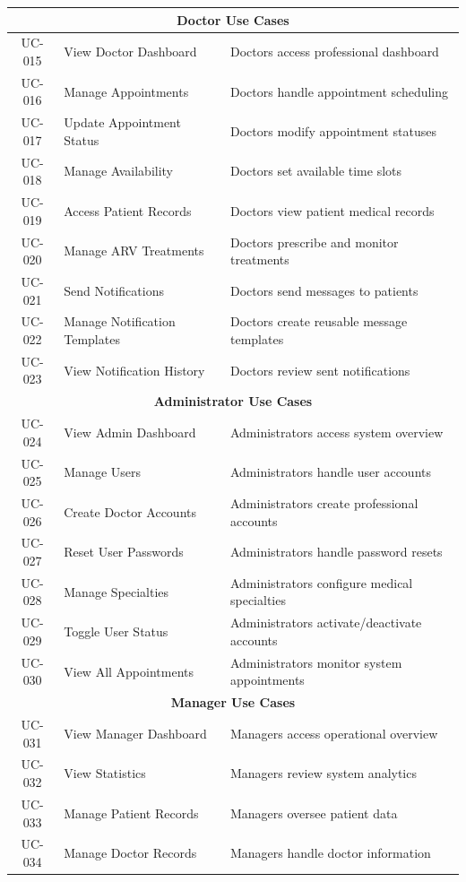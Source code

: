 \documentclass[12pt,a4paper]{article}
\begin{document}
\begin{longtable}{|c|p{4cm}|p{9cm}|}
\hline
\multicolumn{3}{|c|}{\textbf{Doctor Use Cases}} \\
\hline
UC-015 & View Doctor Dashboard & Doctors access professional dashboard \\
\hline
UC-016 & Manage Appointments & Doctors handle appointment scheduling \\
\hline
UC-017 & Update Appointment Status & Doctors modify appointment statuses \\
\hline
UC-018 & Manage Availability & Doctors set available time slots \\
\hline
UC-019 & Access Patient Records & Doctors view patient medical records \\
\hline
UC-020 & Manage ARV Treatments & Doctors prescribe and monitor treatments \\
\hline
UC-021 & Send Notifications & Doctors send messages to patients \\
\hline
UC-022 & Manage Notification Templates & Doctors create reusable message templates \\
\hline
UC-023 & View Notification History & Doctors review sent notifications \\
\hline
\multicolumn{3}{|c|}{\textbf{Administrator Use Cases}} \\
\hline
UC-024 & View Admin Dashboard & Administrators access system overview \\
\hline
UC-025 & Manage Users & Administrators handle user accounts \\
\hline
UC-026 & Create Doctor Accounts & Administrators create professional accounts \\
\hline
UC-027 & Reset User Passwords & Administrators handle password resets \\
\hline
UC-028 & Manage Specialties & Administrators configure medical specialties \\
\hline
UC-029 & Toggle User Status & Administrators activate/deactivate accounts \\
\hline
UC-030 & View All Appointments & Administrators monitor system appointments \\
\hline
\multicolumn{3}{|c|}{\textbf{Manager Use Cases}} \\
\hline
UC-031 & View Manager Dashboard & Managers access operational overview \\
\hline
UC-032 & View Statistics & Managers review system analytics \\
\hline
UC-033 & Manage Patient Records & Managers oversee patient data \\
\hline
UC-034 & Manage Doctor Records & Managers handle doctor information \\

\end{longtable}
\end{document}
